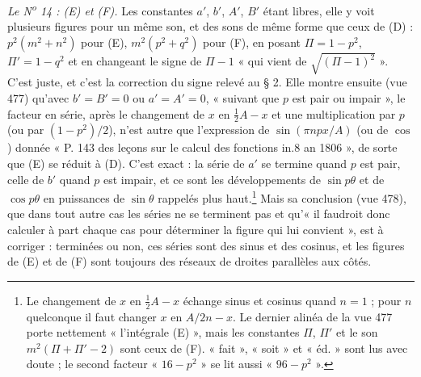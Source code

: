 \documentclass[11pt,a4paper]{article}
\begin{document}
\emph{Le N\textsuperscript{o} 14 : (E) et (F).} Les constantes $a'$, $b'$, $A'$, $B'$
étant libres, elle y voit plusieurs figures pour un même son, et des sons de même forme
que ceux de (D) : $p^2(m^2+n^2)$ pour (E), $m^2(p^2+q^2)$ pour (F), en posant
$\Pi = 1 - p^2$, $\Pi' = 1 - q^2$ et en changeant le signe de $\Pi - 1$ « qui vient de
$\sqrt{(\Pi-1)^2}$ ». C'est juste, et c'est la correction du signe relevé au § 2.
Elle montre ensuite (vue 477) qu'avec $b' = B' = 0$ ou $a' = A' = 0$, « suivant que $p$
est pair ou impair », le facteur en série, après le changement de $x$ en
$\frac12 A - x$ et une multiplication par $p$ (ou par $(1-p^2)/2$), n'est autre que
l'expression de $\sin(\pi n p x/A)$ (ou de $\cos$) donnée « P. 143 des leçons sur le
calcul des fonctions in.8 an 1806 », de sorte que (E) se réduit à (D). C'est exact : la
série de $a'$ se termine quand $p$ est pair, celle de $b'$ quand $p$ est impair, et
ce sont les développements de $\sin p\theta$ et de $\cos p\theta$ en puissances de
$\sin\theta$ rappelés plus haut.\footnote{Le changement de $x$ en $\frac12 A - x$
échange sinus et cosinus quand $n = 1$ ; pour $n$ quelconque il faut changer $x$ en
$A/2n - x$. Le dernier alinéa de la vue 477 porte nettement « l'intégrale (E) », mais
les constantes $\Pi$, $\Pi'$ et le son $m^2(\Pi+\Pi'-2)$ sont ceux de (F). « fait »,
« soit » et « éd. » sont lus avec doute ; le second facteur « $16-p^2$ » se lit aussi
« $96-p^2$ ».} Mais sa conclusion (vue 478), que dans tout autre cas les séries ne se
terminent pas et qu'« il faudroit donc calculer à part chaque cas pour déterminer la
figure qui lui convient », est à corriger : terminées ou non, ces séries sont des sinus
et des cosinus, et les figures de (E) et de (F) sont toujours des réseaux de droites
parallèles aux côtés.
\end{document}
